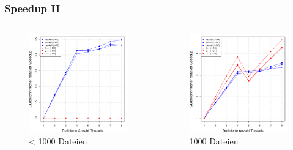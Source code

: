 \documentclass[presentation, shownotes]{beamer}
\begin{document}
\begin{frame}
\frametitle{Speedup II}
\begin{columns}[c]
    \begin{figure}
        \includegraphics[width=\textwidth]{speedup_sub1000_desktop.pdf}
        \caption{< 1000 Dateien}
    \end{figure}

    \begin{figure}
        \includegraphics[width=\textwidth]{speedup_1000_desktop.pdf}
        \caption{1000 Dateien}
    \end{figure}
\end{columns}
\end{frame}
\end{document}
